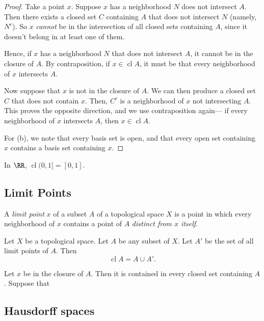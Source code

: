 \documentclass{article}
\DeclareMathOperator{\closure}{cl}
\begin{document}
\begin{proof}
    Take a point $x$.
    Suppose $x$ has a neighborhood $N$ does not intersect $A$.
    Then there exists a closed set $C$ containing $A$ that does not intersect $N$ (namely, $N^c$).
    So $x$ \textit{cannot} be in the intersection of all closed sets containing $A$, since it doesn't belong in at least one of them.

    Hence, if $x$ has a neighborhood $N$ that does not intersect $A$, it cannot be in the closure of $A$.
    By contraposition, if $x \in \closure A$, it must be that every neighborhood of $x$ intersects $A$.

    Now suppose that $x$ is not in the closure of $A$.
    We can then produce a closed set $C$ that does not contain $x$.
    Then, $C^c$ is a neighborhood of $x$ not intersecting $A$.
    This proves the opposite direction, and we use contraposition again--- if every neighborhood of $x$ intersects $A$, then $x \in \closure A$.

    For (b), we note that every basis set is open, and that every open set containing $x$ contains a basis set containing $x$.
\end{proof}

\begin{example}
    In $\RR$, $\closure (0,1] = [0,1]$.

\end{example}


\subsection{Limit Points}

\begin{definition}
    A \textit{limit point} $x$ of a subset $A$ of a topological space $X$ is a point in which every neighborhood of $x$ contains a point of $A$ \textit{distinct from $x$ itself}.
\end{definition}

\begin{theorem}
    Let $X$ be a topological space.
    Let $A$ be any subset of $X$.
    Let $A'$ be the set of all limit points of $A$.
    Then
    \[
        \closure A = A \cup A'.
    \]
\end{theorem}

Let $x$ be in the closure of $A$.
Then it is contained in every closed set containing $A$.
Suppose that

\subsection{Hausdorff spaces}
\end{document}
